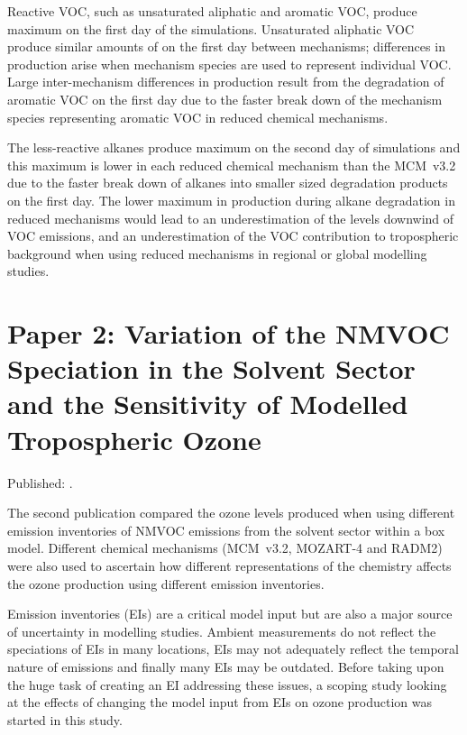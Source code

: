 Reactive VOC, such as unsaturated aliphatic and aromatic VOC, produce maximum  on the first day of the simulations.
Unsaturated aliphatic VOC produce similar amounts of  on the first day between mechanisms; differences in  production arise when mechanism species are used to represent individual VOC.
Large inter-mechanism differences in  production result from the degradation of aromatic VOC on the first day due to the faster break down of the mechanism species representing aromatic VOC in reduced chemical mechanisms.

The less-reactive alkanes produce maximum  on the second day of simulations and this maximum is lower in each reduced chemical mechanism than the MCM~v3.2 due to the faster break down of alkanes into smaller sized degradation products on the first day.
The lower maximum in  production during alkane degradation in reduced mechanisms would lead to an underestimation of the  levels downwind of VOC emissions, and an underestimation of the VOC contribution to tropospheric background  when using reduced mechanisms in regional or global modelling studies.


\singlespacing
\section[Paper 2]{Paper 2: Variation of the NMVOC Speciation in the Solvent Sector and the Sensitivity of Modelled Tropospheric Ozone} \label{s:EI_results}
\onehalfspacing

Published: .
\vspace{5mm}

The second publication compared the ozone levels produced when using different emission inventories of NMVOC emissions from the solvent sector within a box model.
Different chemical mechanisms (MCM~v3.2, MOZART-4 and RADM2) were also used to ascertain how different representations of the chemistry affects the ozone production using different emission inventories.

Emission inventories (EIs) are a critical model input but are also a major source of uncertainty in modelling studies.
Ambient measurements do not reflect the speciations of EIs in many locations, EIs may not adequately reflect the temporal nature of emissions and finally many EIs may be outdated.
Before taking upon the huge task of creating an EI addressing these issues, a scoping study looking at the effects of changing the model input from EIs on ozone production was started in this study.

